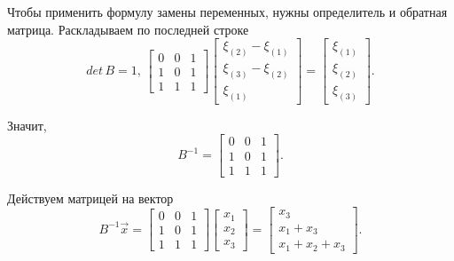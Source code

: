 \begin{enumerate}[label=\alph*)]
  Чтобы применить формулу замены переменных, нужны определитель и обратная матрица.
  Раскладываем по последней строке
  $$det \, B = 1, \,
    \begin{bmatrix}
      0 & 0 & 1 \\
      1 & 0 & 1 \\
      1 & 1 & 1
    \end{bmatrix}
    \begin{bmatrix}
      \xi_{ \left( 2 \right) } - \xi_{ \left( 1 \right) } \\
      \xi_{ \left( 3 \right) } - \xi_{ \left( 2 \right) } \\
      \xi_{ \left( 1 \right) }
    \end{bmatrix} =
    \begin{bmatrix}
      \xi_{ \left( 1 \right) } \\
      \xi_{ \left( 2 \right) } \\
      \xi_{ \left( 3 \right) }
    \end{bmatrix}.$$

  Значит,
  $$B^{-1} =
    \begin{bmatrix}
      0 & 0 & 1 \\
      1 & 0 & 1 \\
      1 & 1 & 1
    \end{bmatrix}.$$

  Действуем матрицей на вектор
  $$B^{-1} \vec{x} =
    \begin{bmatrix}
      0 & 0 & 1 \\
      1 & 0 & 1 \\
      1 & 1 & 1
    \end{bmatrix}
    \begin{bmatrix}
      x_1 \\
      x_2 \\
      x_3
    \end{bmatrix} =
    \begin{bmatrix}
      x_3 \\
      x_1 + x_3 \\
      x_1 + x_2 + x_3
    \end{bmatrix}.$$


\end{enumerate}
